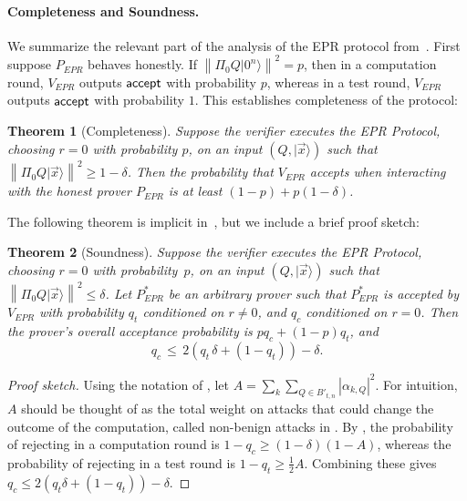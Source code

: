 \documentclass[11pt]{article}
\newtheorem{theorem}{Theorem}
\theoremstyle{remark}
\theoremstyle{definition}
\newcommand{\ket}[1]{|#1\rangle}
\newcommand{\norm}[1]{\left\|#1\right\|}
\begin{document}













 













\paragraph{Completeness and Soundness.} 
We summarize the relevant part of the analysis of the EPR protocol from~\cite{broadbent15howtoverify}. First suppose $P_{EPR}$ behaves honestly. If $\norm{\Pi_0 Q\ket{0^n}}^2=p$, then in a computation round, $V_{EPR}$ outputs $\sf accept$ with probability $p$, whereas in a test round, $V_{EPR}$ outputs $\sf accept$ with probability $1$. This establishes completeness of the protocol:

\begin{theorem}[Completeness]\label{thm:EPR-correctness} 
Suppose the verifier executes the EPR Protocol, choosing $r=0$ with probability $p$, on an input $(Q,\ket{\vec{x}})$ such that $\norm{\Pi_0 Q\ket{\vec{x}}}^2\geq 1-\delta$. Then the probability that $V_{EPR}$ accepts when interacting with the honest prover $P_{EPR}$ is at least $(1-p)+p(1-\delta)$. 
\end{theorem}

The following theorem is implicit in~\cite[Section 7.6]{broadbent15howtoverify}, but we include a brief proof sketch:

\begin{theorem}[Soundness]\label{thm:EPR-soundness} 
Suppose the verifier executes the EPR Protocol, choosing $r=0$ with probability~$p$, on an input $(Q,\ket{\vec{x}})$ such that $\norm{\Pi_0 Q\ket{\vec{x}}}^2\leq \delta$. Let $P_{EPR}^*$ be an arbitrary prover such that $P_{EPR}^*$ is accepted by  $V_{EPR}$ with probability $q_t$ conditioned on $r\neq 0$, and $q_c$ conditioned on $r=0$. Then the prover's overall acceptance probability is $pq_c+(1-p)q_t$, and
$$q_c \,\leq\, 2\left(q_t\,\delta+(1-q_t)\right)-\delta.$$ 
\end{theorem}
\begin{proof}[Proof sketch]
Using the notation of \cite{broadbent15howtoverify}, let $A=\sum_k\sum_{Q\in B'_{t,n}}|\alpha_{k,Q}|^2$. For intuition, $A$ should be thought of as the total weight on attacks that could change the outcome of the computation, called non-benign attacks in \cite{broadbent15howtoverify}. By \cite{broadbent15howtoverify}, the probability of rejecting in a computation round is $1-q_c\geq (1-\delta)(1-A)$, whereas the probability of rejecting in a test round is $1-q_t\geq \frac{1}{2}A$. Combining these gives $q_c\leq 2(q_t\delta+(1-q_t))-\delta$.
\end{proof}
\end{document}
